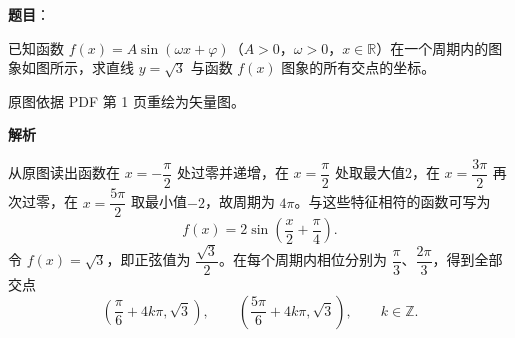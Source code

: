 \begin{answer}

\textbf{题目}：

已知函数 $f(x)=A\sin(\omega x+\varphi)$（$A>0$，$\omega>0$，$x\in\mathbb R$）在一个周期内的图象如图所示，求直线 $y=\sqrt3$ 与函数 $f(x)$ 图象的所有交点的坐标。

\begin{gktip}
原图依据 PDF 第 1 页重绘为矢量图。
\end{gktip}
\nopagebreak[4]
\begin{center}\end{center}
\nopagebreak[4]
\textbf{解析}

从原图读出函数在 $x=-\dfrac\pi2$ 处过零并递增，在 $x=\dfrac\pi2$ 处取最大值2，在 $x=\dfrac{3\pi}{2}$ 再次过零，在 $x=\dfrac{5\pi}{2}$ 取最小值$-2$，故周期为 $4\pi$。与这些特征相符的函数可写为
\nopagebreak[4]
\[
f(x)=2\sin\left(\frac{x}{2}+\frac\pi4\right).
\]
令 $f(x)=\sqrt3$，即正弦值为 $\dfrac{\sqrt3}{2}$。在每个周期内相位分别为 $\dfrac\pi3$、$\dfrac{2\pi}{3}$，得到全部交点
\nopagebreak[4]
\[
\left(\frac\pi6+4k\pi,\sqrt3\right),\qquad
\left(\frac{5\pi}{6}+4k\pi,\sqrt3\right),\qquad k\in\mathbb Z.
\]


\end{answer}

